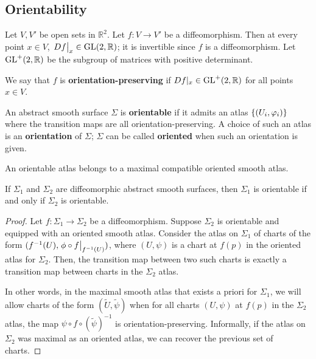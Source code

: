 \documentclass[a4paper]{article}
\begin{document}
\subsection{Orientability}
Let \( V, V' \) be open sets in \( \mathbb R^2 \).
	Let \( f \colon V \to V' \) be a diffeomorphism.
	Then at every point \( x \in V \), \( \eval{Df}_x \in \GL(2,\mathbb R) \); it is invertible since \( f \) is a diffeomorphism.
	Let \( \mathrm{GL}^+(2,\mathbb R) \) be the subgroup of matrices with positive determinant.
\begin{definition}
	We say that \( f \) is \textbf{orientation-preserving} if $ Df|_x\in \mathrm{GL}^+(2,\mathbb R) $ for all points \( x \in V \).
\end{definition}
\begin{definition}
	An abstract smooth surface \( \Sigma \) is \textbf{orientable} if it admits an atlas \( \qty{(U_i, \varphi_i)} \) where the transition maps are all orientation-preserving.
	A choice of such an atlas is an \textbf{orientation} of \( \Sigma \); \( \Sigma \) can be called \textbf{oriented} when such an orientation is given.
\end{definition}
\begin{remark}
	An orientable atlas belongs to a maximal compatible oriented smooth atlas.
\end{remark}
\begin{lemma}
	If \( \Sigma_1 \) and \( \Sigma_2 \) are diffeomorphic abstract smooth surfaces, then \( \Sigma_1 \) is orientable if and only if \( \Sigma_2 \) is orientable.
\end{lemma}
\begin{proof}
	Let \( f \colon \Sigma_1 \to \Sigma_2 \) be a diffeomorphism.
	Suppose \( \Sigma_2 \) is orientable and equipped with an oriented smooth atlas.
	Consider the atlas on \( \Sigma_1 \) of charts of the form \( (f^{-1}(U), \eval{\phi \circ f}_{f^{-1}(U)}) \), where \( (U, \psi) \) is a chart at \( f(p) \) in the oriented atlas for \( \Sigma_2 \).
	Then, the transition map between two such charts is exactly a transition map between charts in the \( \Sigma_2 \) atlas.
	\begin{center}
	\end{center}
	In other words, in the maximal smooth atlas that exists a priori for \( \Sigma_1 \), we will allow charts of the form \( (\widetilde U, \widetilde \psi) \) when for all charts \( (U, \psi) \) at \( f(p) \) in the \( \Sigma_2 \) atlas, the map \( \psi \circ f \circ (\widetilde \psi)^{-1} \) is orientation-preserving.
	Informally, if the atlas on \( \Sigma_2 \) was maximal as an oriented atlas, we can recover the previous set of charts.
\end{proof}
\end{document}

